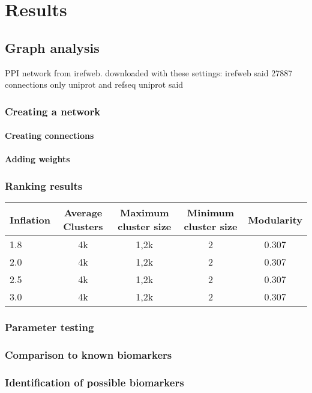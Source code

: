 \part{Results}
\label{pa:results}
\chapter{Graph analysis}
PPI network from irefweb.
downloaded with these settings: %
irefweb said 27887 connections %
only uniprot and refseq
uniprot said
\section{Creating a network}
\subsection{Creating connections}
\subsection{Adding weights}
\section{Ranking results}
\begin{table}[H]
    \centering
    \begin{tabular}{| l | c | c | c | c |}
        \hline
        \textbf{Inflation} & \textbf{Average Clusters} & \textbf{Maximum cluster
    size} & \textbf{Minimum cluster size} & \textbf{Modularity} \\
        \hline
        1.8 & 4k & 1,2k & 2 & 0.307 \\
        2.0 & 4k & 1,2k & 2 & 0.307 \\
        2.5 & 4k & 1,2k & 2 & 0.307 \\
        3.0 & 4k & 1,2k & 2 & 0.307 \\
        \hline
    \end{tabular}
\end{table}
\section{Parameter testing}
\section{Comparison to known biomarkers}
\section{Identification of possible biomarkers}
